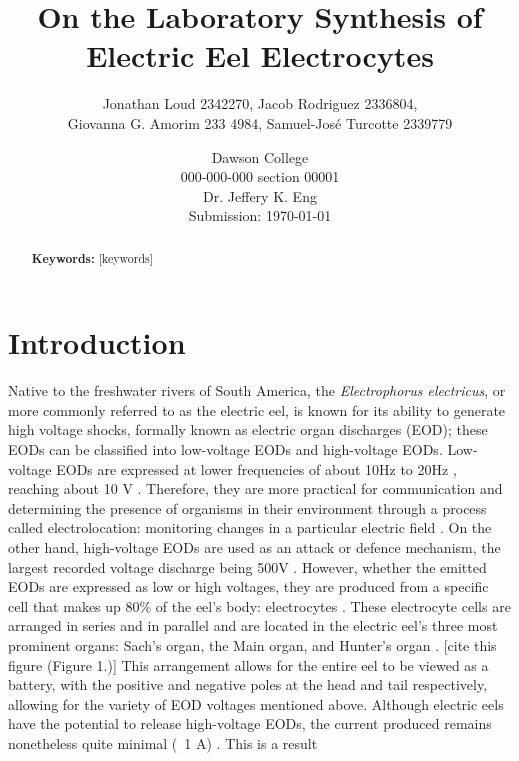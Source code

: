 \documentclass[letterpaper]{article}
\title{On the Laboratory Synthesis of Electric Eel Electrocytes}
\author{Jonathan Loud 2342270, Jacob Rodriguez 2336804, \\
Giovanna G. Amorim 233 4984, Samuel-José Turcotte 2339779}
\date{Dawson College \\[15pt]
000-000-000 section 00001\\[15pt]
Dr. Jeffery K. Eng\\[15pt]
Submission: \today}
\begin{document}
\maketitle

\begin{abstract}
        
	\noindent\textbf{Keywords:} [keywords]
\end{abstract}

\tableofcontents

\newpage

\section{Introduction}
\label{sec:introduction}

Native to the freshwater rivers of South America, the \textit{Electrophorus electricus}, or more 
commonly referred to as the electric eel, is known for its ability to generate high voltage shocks,
formally known as electric organ discharges (EOD); these EODs can be classified into low-voltage 
EODs and high-voltage EODs. Low-voltage EODs are expressed at lower frequencies of about 10Hz to
20Hz \parencite{cataniaAstonishingBehaviorElectric2019}, reaching about 10 V \parencite{ElectricCircuits6ElectricEels2015}. 
Therefore, they are more practical for communication and determining the presence of organisms 
in their environment through a process called electrolocation: monitoring 
changes in a particular electric field \parencite{bennettComparativePhysiologyElectric1970}. 
On the other hand, high-voltage EODs are used as an attack or defence mechanism,
the largest recorded voltage discharge being 500V \parencite{ElectricCircuits6ElectricEels2015}.
However, whether the emitted EODs are expressed as low or high 
voltages, they are produced from a specific cell that makes up 80\% of the eel’s body: electrocytes
\parencite{carlsonAnimalBehaviorElectric2015}. These electrocyte cells are arranged in series and 
in parallel and are located in the electric eel’s three most prominent organs: Sach’s organ, the 
Main organ, and Hunter’s organ \parencite{ElectricCircuits6ElectricEels2015}. [cite this figure (Figure 1.)] This 
arrangement allows for the entire eel to be viewed as a battery, with the positive and negative 
poles at the head and tail respectively, allowing for the variety of EOD voltages mentioned above. 
Although electric eels have the potential to release high-voltage EODs, the current produced remains
nonetheless quite minimal (~1 A) \parencite{ElectricCircuits6ElectricEels2015}. This is a result 
\end{document}

